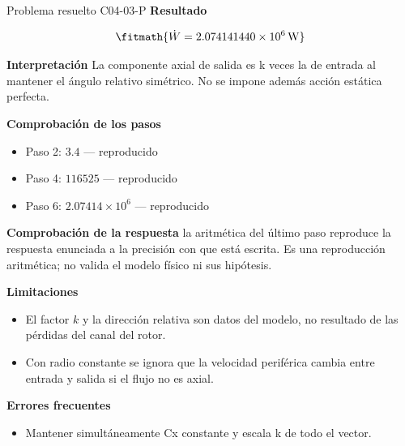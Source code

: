 \documentclass[10pt,openany]{book}
\begin{document}
\begin{studiumworked}{Problema resuelto C04-03-P}
\noindent\textbf{Resultado}

\[
\fitmath{\dot{W}=2.074141440\times10^{6}\,\mathrm{W}}
\]

\noindent\textbf{Interpretación}
La componente axial de salida es k veces la de entrada al mantener el ángulo relativo simétrico. No se impone además acción estática perfecta.

\noindent\textbf{Comprobación de los pasos}
\begin{itemize}
\item Paso 2: $3.4$ — reproducido
\item Paso 4: $116525$ — reproducido
\item Paso 6: $2.07414\times 10^{6}$ — reproducido
\end{itemize}

\noindent\textbf{Comprobación de la respuesta} la aritmética del último paso reproduce la respuesta enunciada a la precisión con que está escrita. Es una reproducción aritmética; no valida el modelo físico ni sus hipótesis.

\noindent\textbf{Limitaciones}
\begin{itemize}
\item El factor $k$ y la dirección relativa son datos del modelo, no resultado de las pérdidas del canal del rotor.
\item Con radio constante se ignora que la velocidad periférica cambia entre entrada y salida si el flujo no es axial.
\end{itemize}

\noindent\textbf{Errores frecuentes}
\begin{itemize}
\item Mantener simultáneamente Cx constante y escala k de todo el vector.
\end{itemize}
\end{studiumworked}
\end{document}
